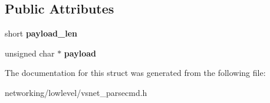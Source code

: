 \subsection*{Public Attributes}
\begin{DoxyCompactItemize}
\item 
short {\bfseries payload\+\_\+len}\hypertarget{structVsnetDownload_1_1Adapter_1_1DownloadFragment_a7be3679675804e42ff518a18b107b5e8}{}\label{structVsnetDownload_1_1Adapter_1_1DownloadFragment_a7be3679675804e42ff518a18b107b5e8}

\item 
unsigned char $\ast$ {\bfseries payload}\hypertarget{structVsnetDownload_1_1Adapter_1_1DownloadFragment_a99b46a4422accb09bcd432996ff8b1c1}{}\label{structVsnetDownload_1_1Adapter_1_1DownloadFragment_a99b46a4422accb09bcd432996ff8b1c1}

\end{DoxyCompactItemize}


The documentation for this struct was generated from the following file\+:\begin{DoxyCompactItemize}
\item 
networking/lowlevel/vsnet\+\_\+parsecmd.\+h\end{DoxyCompactItemize}
